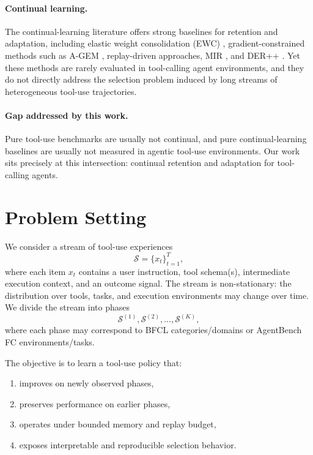 \documentclass{article}
\begin{document}
\paragraph{Continual learning.}
The continual-learning literature offers strong baselines for retention and adaptation, including elastic weight consolidation (EWC) \citep{kirkpatrick2017ewc}, gradient-constrained methods such as A-GEM \citep{chaudhry2019agem}, replay-driven approaches, MIR \citep{aljundi2019mir}, and DER++ \citep{buzzega2020derpp}. Yet these methods are rarely evaluated in tool-calling agent environments, and they do not directly address the selection problem induced by long streams of heterogeneous tool-use trajectories.

\paragraph{Gap addressed by this work.}
Pure tool-use benchmarks are usually not continual, and pure continual-learning baselines are usually not measured in agentic tool-use environments. Our work sits precisely at this intersection: continual retention and adaptation for tool-calling agents.

\section{Problem Setting}

We consider a stream of tool-use experiences
\[
\mathcal{S} = \{x_t\}_{t=1}^{T},
\]
where each item $x_t$ contains a user instruction, tool schema(s), intermediate execution context, and an outcome signal. The stream is non-stationary: the distribution over tools, tasks, and execution environments may change over time. We divide the stream into phases
\[
\mathcal{S}^{(1)}, \mathcal{S}^{(2)}, \ldots, \mathcal{S}^{(K)},
\]
where each phase may correspond to BFCL categories/domains or AgentBench FC environments/tasks.

The objective is to learn a tool-use policy that:
\begin{enumerate}[leftmargin=14pt]
    \item improves on newly observed phases,
    \item preserves performance on earlier phases,
    \item operates under bounded memory and replay budget,
    \item exposes interpretable and reproducible selection behavior.
\end{enumerate}
\end{document}
